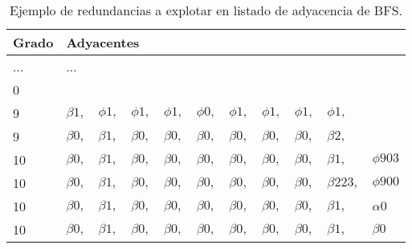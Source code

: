  \begin{table}%
\caption{Ejemplo de redundancias a explotar en listado de adyacencia de BFS.}
\label{table:bfs-exploting}
\centering
\footnotesize

\begin{tabular}{|l|llllllllll|}
	\toprule
	Grado & \multicolumn{9}{l}{Adyacentes} & \\
	\midrule
	\cellcolor{blanco} ... & \multicolumn{9}{l}{\cellcolor{blanco} ...} & \\
	\cellcolor{blanco} 0 & \multicolumn{9}{l}{} & \\
	\cellcolor{rojo} 9 & \cellcolor{blanco} $\beta1,$ & \cellcolor{cafe} $\phi1,$ & \cellcolor{cafe} $\phi1,$ & \cellcolor{cafe} $\phi1,$ & \cellcolor{blanco} $\phi0,$ & \cellcolor{blanco} $\phi1,$ & \cellcolor{blanco} $\phi1,$ & \cellcolor{blanco} $\phi1,$ & \cellcolor{blanco} $\phi1,$ & \\
    \cellcolor{rojo} 9 & \cellcolor{azul} $\beta0,$ & \cellcolor{azul} $\beta1,$ & \cellcolor{azul} $\beta0,$ & \cellcolor{azul} $\beta0,$ & \cellcolor{azul} $\beta0,$ & \cellcolor{azul} $\beta0,$ & \cellcolor{azul} $\beta0,$ & \cellcolor{azul} $\beta0,$ & \cellcolor{blanco} $\beta2,$ & \\
    \cellcolor{blanco} 10 &  \cellcolor{azul} $\beta0,$ & \cellcolor{azul} $\beta1,$ & \cellcolor{azul} $\beta0,$ & \cellcolor{azul} $\beta0,$ & \cellcolor{azul} $\beta0,$ & \cellcolor{azul} $\beta0,$ & \cellcolor{azul} $\beta0,$ & \cellcolor{azul} $\beta0,$  & \cellcolor{blanco} $\beta1,$ & \cellcolor{blanco} $\phi903$ \\
    \cellcolor{blanco} 10 &  \cellcolor{azul} $\beta0,$ & \cellcolor{azul} $\beta1,$ & \cellcolor{azul} $\beta0,$ & \cellcolor{azul} $\beta0,$ & \cellcolor{azul} $\beta0,$ & \cellcolor{azul} $\beta0,$ & \cellcolor{azul} $\beta0,$ & \cellcolor{azul} $\beta0,$  & \cellcolor{blanco} $\beta223,$ & \cellcolor{blanco} $\phi900$ \\
    \cellcolor{blanco} 10 &  \cellcolor{azul} $\beta0,$ & \cellcolor{azul} $\beta1,$ & \cellcolor{azul} $\beta0,$ & \cellcolor{azul} $\beta0,$ & \cellcolor{azul} $\beta0,$ & \cellcolor{azul} $\beta0,$ & \cellcolor{azul} $\beta0,$ & \cellcolor{azul} $\beta0,$  & \cellcolor{blanco} $\beta1,$ & \cellcolor{blanco} $\alpha0$ \\
    \cellcolor{amarillo} 10 & \cellcolor{verde} $\beta0,$ & \cellcolor{verde} $\beta1,$ & \cellcolor{verde} $\beta0,$ & \cellcolor{verde} $\beta0,$ & \cellcolor{verde} $\beta0,$ & \cellcolor{verde} $\beta0,$ & \cellcolor{verde} $\beta0,$ & \cellcolor{verde} $\beta0,$ & \cellcolor{amarillo} $\beta1,$ & \cellcolor{amarillo} $\beta0$ \\

\end{tabular}
\end{table}
